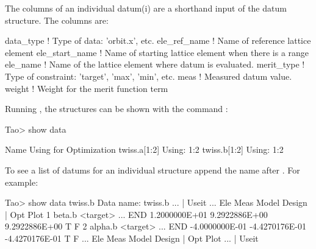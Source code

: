 \documentclass{hitec}
\begin{document}
The columns of an individual datum(i) are a shorthand input of the datum structure.  The columns
are:
\begin{code}
data_type       ! Type of data: 'orbit.x', etc.
ele_ref_name    ! Name of reference lattice element
ele_start_name  ! Name of starting lattice element when there is a range
ele_name        ! Name of the lattice element where datum is evaluated.
merit_type      ! Type of constraint: 'target', 'max', 'min', etc.
meas            ! Measured datum value.
weight          ! Weight for the merit function term
\end{code}

Running \tao, the  structures can be shown with the command : 
\begin{code}
Tao> show data

  Name                                 Using for Optimization
  twiss.a[1:2]                                   Using: 1:2
  twiss.b[1:2]                                   Using: 1:2
\end{code}

To see a list of datums for an individual  structure append the  name after .
For example:
\begin{code}
Tao> show data twiss.b
Data name: twiss.b
                     ...                                                       |   Useit
                     ...  Ele             Meas           Model          Design | Opt  Plot
 1  beta.b <target>  ...  END    1.2000000E+01   9.2922886E+00   9.2922886E+00     T     F
 2  alpha.b <target> ...  END   -4.0000000E-01  -4.4270176E-01  -4.4270176E-01     T     F
                     ...  Ele             Meas           Model          Design | Opt  Plot
                     ...                                                       |   Useit
\end{code}
\end{document}
